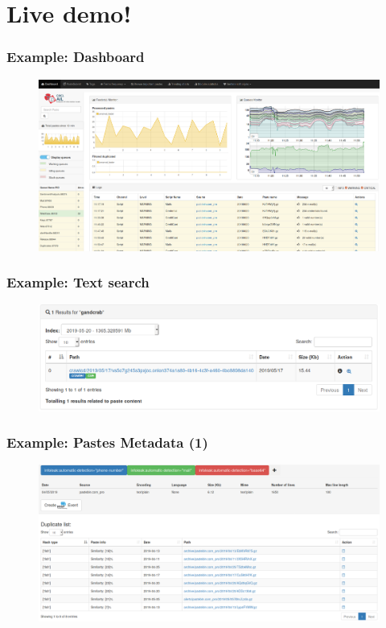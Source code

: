 \documentclass{beamer}
\begin{document}
\section{Live demo!}

\begin{frame}
    \frametitle{Example: Dashboard}
    \begin{figure}
        \includegraphics[scale=0.18, angle=0]{screenshot/dashboard.png}
    \end{figure}
\end{frame}


\begin{frame}
    \frametitle{Example: Text search}
    \begin{figure}
        \includegraphics[scale=0.3, angle=0]{images/ail_02.png}
    \end{figure}
\end{frame}

\begin{frame}
    \frametitle{Example: Pastes Metadata (1)}
    \begin{figure}
        \includegraphics[scale=0.21, angle=0]{images/ail_15.png}
    \end{figure}
\end{frame}
\end{document}
